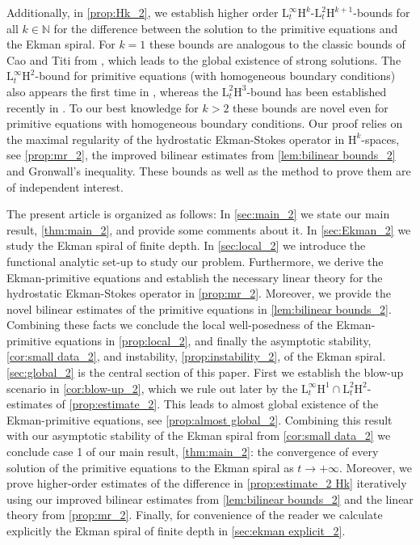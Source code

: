 \documentclass[preprint]{elsarticle}
\numberwithin{equation}{section}
\newcommand {\N}	{\mathbb{N}}
\renewcommand{\H}{\mathrm{H}}
\newcommand{\rL}{\mathrm{L}}
\newcommand{\rH}{\H}
\newcommand{\rE}{\mathrm{E}}
\begin{document}

Additionally, in \autoref{prop:Hk_2}, we establish higher order $\rL^\infty_t \rH^k$-$\rL^2_t \rH^{k+1}$-bounds  for all $k \in \N$ for the difference between the solution to the primitive equations and the Ekman spiral.
For $k = 1$ these bounds are analogous to the classic bounds of Cao and Titi from \cite{CT:07_2}, which leads to the global existence of strong solutions. The $\rL^\infty_t \rH^2$-bound for primitive equations (with homogeneous boundary conditions) also appears the first time in \cite{CT:07_2}, whereas the $\rL^2_t \rH^{3}$-bound has been established recently in \cite[Appendix A]{Fur:24_2}.
To our best knowledge for $k > 2$ these bounds are novel even for primitive equations with homogeneous boundary conditions.
Our proof relies on the maximal regularity of the hydrostatic Ekman-Stokes operator in $\rH^k$-spaces, see \autoref{prop:mr_2}, the improved bilinear estimates from \autoref{lem:bilinear bounds_2} and Gronwall's inequality.
These bounds as well as the method to prove them are of independent interest. 

\medskip

\enlargethispage{\baselineskip}
The present article is organized as follows: 
In \autoref{sec:main_2} we state our main result, \autoref{thm:main_2}, and provide some comments about it. In \autoref{sec:Ekman_2} we study the Ekman spiral of finite depth. 
In \autoref{sec:local_2} we introduce the functional analytic set-up to study our problem. Furthermore, we derive the Ekman-primitive equations and establish the necessary linear theory for the hydrostatic Ekman-Stokes operator in \autoref{prop:mr_2}. Moreover, we provide the novel bilinear estimates of the primitive equations in \autoref{lem:bilinear bounds_2}. 
Combining these facts we conclude the local well-posedness of the Ekman-primitive equations in \autoref{prop:local_2}, and finally the asymptotic stability, \autoref{cor:small data_2}, and instability, \autoref{prop:instability_2}, of the Ekman spiral.
\autoref{sec:global_2} is the central section of this paper. First we establish the blow-up scenario in \autoref{cor:blow-up_2}, which we rule out later by the  $\rL^\infty_t\rH^1 \cap \rL^2_t \rH^2$-estimates of \autoref{prop:estimate_2}. This leads to almost global existence of the Ekman-primitive equations, see \autoref{prop:almost global_2}.
Combining this result with our asymptotic stability of the Ekman spiral from \autoref{cor:small data_2} we conclude case 1 of our main result, \autoref{thm:main_2}: the convergence of every solution of the primitive equations to the Ekman spiral as $t \to +\infty$. 
Moreover, we prove higher-order estimates of the difference in \autoref{prop:estimate_2 Hk} iteratively using our improved bilinear estimates from \autoref{lem:bilinear bounds_2} and the linear theory from \autoref{prop:mr_2}.
Finally, for convenience of the reader we calculate explicitly the Ekman spiral of finite depth in \autoref{sec:ekman explicit_2}.  
\end{document}
